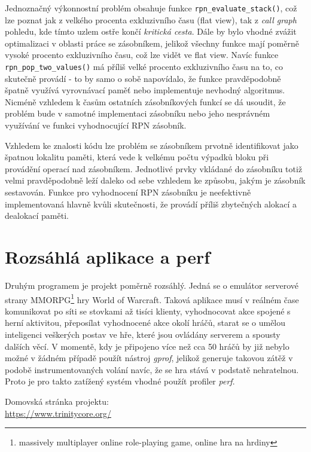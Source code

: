 \documentclass[czech,BP]{thesiskiv}
\begin{document}
Jednoznačný výkonnostní problém obsahuje funkce \texttt{rpn\_evaluate\_stack()}, což lze poznat jak z velkého procenta exkluzivního času (flat view), tak z \emph{call graph} pohledu, kde tímto uzlem ostře končí \emph{kritická cesta}. Dále by bylo vhodné zvážit optimalizaci v oblasti práce se zásobníkem, jelikož všechny funkce mají poměrně vysoké procento exkluzivního času, což lze vidět ve flat view. Navíc funkce \texttt{rpn\_pop\_two\_values()} má příliš velké procento exkluzivního času na to, co skutečně provádí - to by samo o sobě napovídalo, že funkce pravděpodobně špatně využívá vyrovnávací paměť nebo implementuje nevhodný algoritmus. Nicméně vzhledem k časům ostatních zásobníkových funkcí se dá usoudit, že problém bude v samotné implementaci zásobníku nebo jeho nesprávném využívání ve funkci vyhodnocující RPN zásobník.

Vzhledem ke znalosti kódu lze problém se zásobníkem prvotně identifikovat jako špatnou lokalitu paměti, která vede k velkému počtu výpadků bloku při provádění operací nad zásobníkem. Jednotlivé prvky vkládané do zásobníku totiž velmi pravděpodobně leží daleko od sebe vzhledem ke způsobu, jakým je zásobník sestavován. Funkce pro vyhodnocení RPN zásobníku je neefektivně implementovaná hlavně kvůli skutečnosti, že provádí příliš zbytečných alokací a dealokací paměti.


\section{Rozsáhlá aplikace a perf}\label{sec:overeni2}

Druhým programem je projekt poměrně rozsáhlý. Jedná se o emulátor serverové strany MMORPG\footnote{massively multiplayer online role-playing game, online hra na hrdiny} hry World of Warcraft. Taková aplikace musí v reálném čase komunikovat po síti se stovkami až tisíci klienty, vyhodnocovat akce spojené s herní aktivitou, přeposílat vyhodnocené akce okolí hráčů, starat se o umělou inteligenci veškerých postav ve hře, které jsou ovládány serverem a spousty dalších věcí. V momentě, kdy je připojeno více než cca 50 hráčů by již nebylo možné v žádném případě použít nástroj \emph{gprof}, jelikož generuje takovou zátěž v podobě instrumentovaných volání navíc, že se hra stává v podstatě nehratelnou. Proto je pro takto zatížený systém vhodné použít profiler \emph{perf}.

Domovská stránka projektu:\\
\url{https://www.trinitycore.org/}
\end{document}
